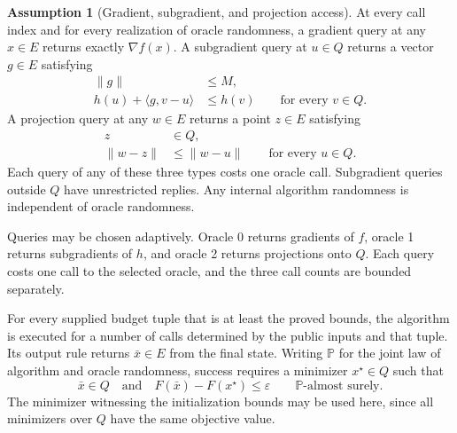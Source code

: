 \documentclass[10pt]{article}
\theoremstyle{definition}
\newtheorem{assumption}{Assumption}
\begin{document}
\begin{assumption}[Gradient, subgradient, and projection access]
At every call index and for every realization of oracle randomness, a gradient query at any $x\in E$ returns exactly $\nabla f(x)$. A subgradient query at $u\in Q$ returns a vector $g\in E$ satisfying
\begin{align*}
\|g\|&\leq M,\\
h(u)+\langle g,v-u\rangle&\leq h(v)
\qquad\text{for every }v\in Q.
\end{align*}
A projection query at any $w\in E$ returns a point $z\in E$ satisfying
\begin{align*}
z&\in Q,\\
\|w-z\|&\leq\|w-u\|
\qquad\text{for every }u\in Q.
\end{align*}
Each query of any of these three types costs one oracle call. Subgradient queries outside $Q$ have unrestricted replies. Any internal algorithm randomness is independent of oracle randomness.
\end{assumption}

Queries may be chosen adaptively. Oracle 0 returns gradients of $f$, oracle 1 returns subgradients of $h$, and oracle 2 returns projections onto $Q$. Each query costs one call to the selected oracle, and the three call counts are bounded separately.

For every supplied budget tuple that is at least the proved bounds, the algorithm is executed for a number of calls determined by the public inputs and that tuple. Its output rule returns $\bar{x}\in E$ from the final state. Writing $\mathbb{P}$ for the joint law of algorithm and oracle randomness, success requires a minimizer $x^\star\in Q$ such that
\[
\bar{x}\in Q
\quad\text{and}\quad
F(\bar{x})-F(x^\star)\leq\varepsilon
\qquad\mathbb{P}\text{-almost surely}.
\]
The minimizer witnessing the initialization bounds may be used here, since all minimizers over $Q$ have the same objective value.
\end{document}
